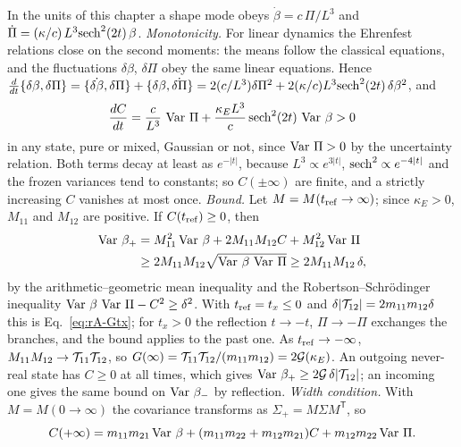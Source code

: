 \begin{rAproof}
In the units of this chapter a shape mode obeys $\dot\beta=c\,\Pi/L^3$ and $\dot\Pi=(\kappa/c)\,L^3{\rm sech}^2(2t)\,\beta$.
\emph{Monotonicity.} For linear dynamics the Ehrenfest relations close on the second moments: the means follow the classical equations, and the fluctuations $\delta\beta$, $\delta\Pi$ obey the same linear equations.
Hence $\tfrac{d}{dt}\{\delta\beta,\delta\Pi\}=\{\dot{\delta\beta},\delta\Pi\}+\{\delta\beta,\dot{\delta\Pi}\}=2(c/L^3)\delta\Pi^2+2(\kappa/c)L^3{\rm sech}^2(2t)\,\delta\beta^2$, and
\begin{equation}
\frac{dC}{dt}=\frac{c}{L^3}\,\operatorname{Var}\,\Pi+\frac{\kappa_EL^3}{c}\,{\rm sech}^2(2t)\,\operatorname{Var}\,\beta>0
\label{eq:rA-dCdt}
\end{equation}
in any state, pure or mixed, Gaussian or not, since $\operatorname{Var}\,\Pi>0$ by the uncertainty relation.
Both terms decay at least as $e^{-|t|}$, because $L^3\propto e^{3|t|}$, ${\rm sech}^2\propto e^{-4|t|}$ and the frozen variances tend to constants; so $C(\pm\infty)$ are finite, and a strictly increasing $C$ vanishes at most once.
\emph{Bound.} Let $M=M(t_{\rm ref}\to\infty)$; since $\kappa_E>0$, $M_{11}$ and $M_{12}$ are positive.
If $C(t_{\rm ref})\geq0$, then
\begin{equation}
\begin{split}
\operatorname{Var}\,\beta_+&=M_{11}^2\operatorname{Var}\,\beta+2M_{11}M_{12}C+M_{12}^2\operatorname{Var}\,\Pi\\
&\geq2M_{11}M_{12}\sqrt{\operatorname{Var}\,\beta\,\operatorname{Var}\,\Pi}\geq2M_{11}M_{12}\,\delta,
\end{split}
\end{equation}
by the arithmetic--geometric mean inequality and the Robertson--Schr\"odinger inequality $\operatorname{Var}\,\beta\,\operatorname{Var}\,\Pi-C^2\geq\delta^2$.
With $t_{\rm ref}=t_x\leq0$ and $\delta|\mathcal{T}_{12}|=2m_{11}m_{12}\delta$ this is Eq.~\eqref{eq:rA-Gtx}; for $t_x>0$ the reflection $t\to-t$, $\Pi\to-\Pi$ exchanges the branches, and the bound applies to the past one.
As $t_{\rm ref}\to-\infty$, $M_{11}M_{12}\to\mathcal{T}_{11}\mathcal{T}_{12}$, so $G(\infty)=\mathcal{T}_{11}\mathcal{T}_{12}/(m_{11}m_{12})=2\mathcal{G}(\kappa_E)$.
An outgoing never-real state has $C\geq0$ at all times, which gives $\operatorname{Var}\,\beta_+\geq2\mathcal{G}\,\delta|\mathcal{T}_{12}|$; an incoming one gives the same bound on $\operatorname{Var}\,\beta_-$ by reflection.
\emph{Width condition.} With $M=M(0\to\infty)$ the covariance transforms as $\Sigma_+=M\Sigma M^{\mathsf T}$, so
\begin{equation}
C(+\infty)=m_{11}m_{21}\rAVar\,\beta+(m_{11}m_{22}+m_{12}m_{21})C+m_{12}m_{22}\rAVar\,\Pi .

\end{equation}
\end{rAproof}
